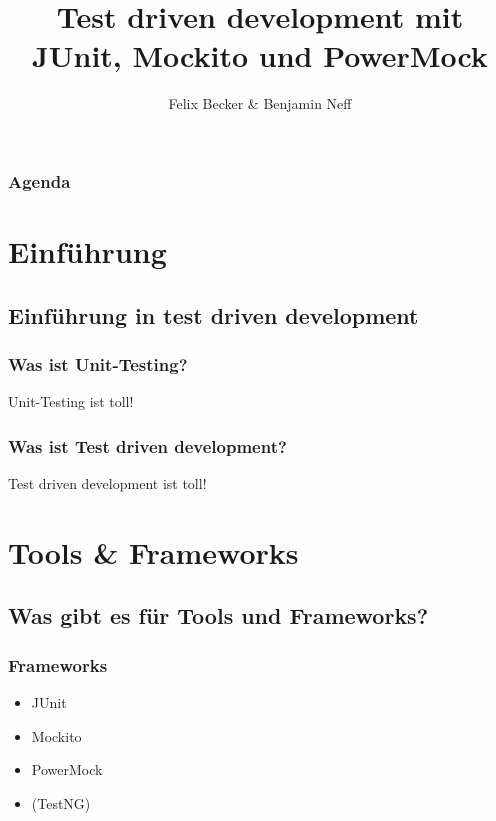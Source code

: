 \documentclass{beamer}
\title{Test driven development mit JUnit, Mockito und PowerMock}
\institute{Computerseminar Tondorf 2011}
\author[F. Becker, B. Neff]{
        Felix Becker \& 
	Benjamin Neff
}
\begin{document}
	\begin{frame}
		\titlepage
	\end{frame}

	\begin{frame}
		\frametitle{Agenda}
		\setcounter{tocdepth}{1}
		\tableofcontents
	\end{frame}
	

	\section{Einführung}
	
		\subsection{Einführung in test driven development}

			\begin{frame}
				\frametitle{Was ist Unit-Testing?}

				Unit-Testing ist toll!
			\end{frame}

			\begin{frame}
				\frametitle{Was ist Test driven development?}

				Test driven development ist toll!
			\end{frame}

	
	\section{Tools \& Frameworks}

		\subsection{Was gibt es für Tools und Frameworks?}

			\begin{frame}
				\frametitle{Frameworks}

				\begin{itemize}
					\item{JUnit}
					\item{Mockito}
					\item{PowerMock}
					\item{(TestNG)}
				\end{itemize}
			\end{frame}
\end{document}
